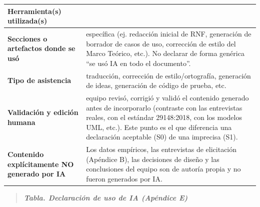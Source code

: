 {\def\LTcaptype{none} %
\begin{longtable}[]{@{}
  >{\raggedright\arraybackslash}p{}
  >{\raggedright\arraybackslash}p{}@{}}
\toprule\noalign{}
\begin{minipage}[b]{\linewidth}\raggedright
\textbf{Herramienta(s) utilizada(s)}
\end{minipage} & \begin{minipage}[b]{\linewidth}\raggedright
\end{minipage} \\
\midrule\noalign{}
\endhead
\bottomrule\noalign{}
\endlastfoot
\textbf{Secciones o artefactos donde se usó} & %
específica (ej. redacción inicial de RNF, generación de borrador de
casos de uso, corrección de estilo del Marco Teórico, etc.). No
declarar de forma genérica ``se usó IA en todo el documento''. \\
\textbf{Tipo de asistencia} & %
traducción, corrección de estilo/ortografía, generación de ideas,
generación de código de prueba, etc. \\
\textbf{Validación y edición humana} & %
equipo revisó, corrigió y validó el contenido generado antes de
incorporarlo (contraste con las entrevistas reales, con el estándar
29148:2018, con los modelos UML, etc.). Este punto es el que
diferencia una declaración aceptable (S0) de una imprecisa (S1). \\
\textbf{Contenido explícitamente NO generado por IA} & Los datos
empíricos, las entrevistas de elicitación (Apéndice B), las
decisiones de diseño y las conclusiones del equipo son de autoría
propia y no fueron generados por IA. \\
\end{longtable}
}

\begin{quote}
\protect{}\label{_bookmark-anexoE}{}\emph{\textbf{Tabla.
Declaración de uso de IA (Apéndice E)}}
\end{quote}
